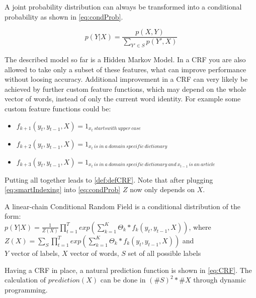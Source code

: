 \documentclass[12pt, twoside]{report}
\begin{document}
A joint probability distribution can always be transformed into a conditional probability as shown in \cref{eq:condProb}.

\begin{equation}\label{eq:condProb}
p(Y|X) = \frac{p(X,Y)}{\sum_{Y'\in S}^{}p(Y', X)}
\end{equation}

The described model so far is a Hidden Markov Model. In a CRF you are also allowed to take only a subset of these features, what can improve performance without loosing accuracy. Additional improvement in a CRF can very likely be achieved by further custom feature functions, which may depend on the whole vector of words, instead of only the current word identity. For example some custom feature functions could be:

\begin{itemize}
\item $f_{k+1}(y_t, y_{t-1}, X) = 1_{x_t\ starts with\ upper\ case}$
\item $f_{k+2}(y_t, y_{t-1}, X) = 1_{x_t\ is\ in\ a\ domain\ specific\ dictionary}$
\item $f_{k+3}(y_t, y_{t-1}, X) = 1_{x_t\ is\ in\ a\ domain\ specific\ dictionary\ and\ x_{t-1}\ is\ an\ article}$
\end{itemize}

Putting all together leads to \cref{def:defCRF}. Note that after plugging \cref{eq:smartIndexing} into \cref{eq:condProb} $Z$ now only depends on $X$.

\begin{defn} \label{def:defCRF}
    A linear-chain Conditional Random Field is a conditional distribution of the form: \vspace*{0.5em} \\
    $p(Y|X) = \frac{1}{Z(X)}\prod_{t=1}^T exp(\sum_{k=1}^{K} \Theta_{k} * f_k(y_t, y_{t-1}, X))$, where \\
    \hspace*{2em}$Z(X) = \sum_{S}^{}\prod_{t=1}^T exp(\sum_{k=1}^{K} \Theta_{k} * f_k(y_t, y_{t-1}, X))$ and \\
    \hspace*{2em}$Y$ vector of labels, $X$ vector of words, $S$ set of all possible labels
\end{defn}

Having a CRF in place, a natural prediction function is shown in \cref{eq:CRF}. The calculation of $prediction(X)$ can be done in $(\#S)^2*\#X$ through dynamic programming.
\end{document}

